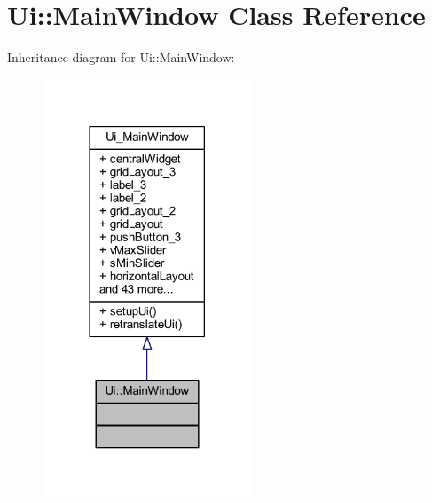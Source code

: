 \hypertarget{class_ui_1_1_main_window}{}\section{Ui\+:\+:Main\+Window Class Reference}
\label{class_ui_1_1_main_window}


Inheritance diagram for Ui\+:\+:Main\+Window\+:\nopagebreak
\begin{figure}[H]
\begin{center}
\leavevmode
\includegraphics[width=177pt]{d4/de8/class_ui_1_1_main_window__inherit__graph}
\end{center}
\end{figure}


